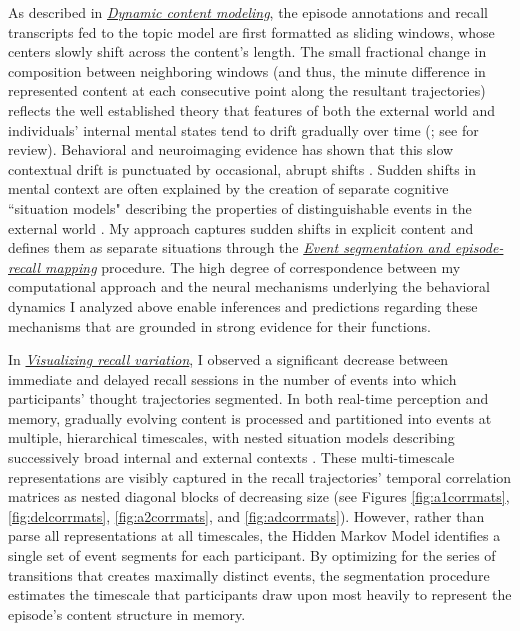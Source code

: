 \documentclass{article}
\begin{document}
As described in \hyperref[sec:topicmodeling]{\textit{Dynamic content modeling}}, the episode annotations and recall transcripts fed to the topic model are first formatted as sliding windows, whose centers slowly shift across the content's length. The small fractional change in composition between neighboring windows (and thus, the minute difference in represented content at each consecutive point along the resultant trajectories) reflects the well established theory that features of both the external world and individuals' internal mental states tend to drift gradually over time (\citealp{HowaKaha02a,ChanEtal17}; see \citealp{Kaha12,MannEtal15} for review).  Behavioral and neuroimaging evidence has shown that this slow contextual drift is punctuated by occasional, abrupt shifts \citep{ZackEtal01a, ZackEtal01b, PolyEtal09, EzzyDava11, DuBrDava13, EzzyDava14, MannEtal16, HeusEtal16, DuBrDava16, ClewDava17, BaldEtal17, BaldEtal18, AlyEtal18, BrunEtal18, HeusEtal18b, SilvEtal19}.  Sudden shifts in mental context are often explained by the creation of separate cognitive ``situation models" describing the properties of distinguishable events in the external world \citep{ZwaaEtal95, ZwaaRadv98, Radv12, RadvZack17}.  My approach captures sudden shifts in explicit content and defines them as separate situations through the \hyperref[sec:eventseg]{\textit{Event segmentation and episode-recall mapping}} procedure.  The high degree of correspondence between my computational approach and the neural mechanisms underlying the behavioral dynamics I analyzed above enable inferences and predictions regarding these mechanisms that are grounded in strong evidence for their functions.

In \hyperref[sec:trajresults]{\textit{Visualizing recall variation}}, I observed a significant decrease between immediate and delayed recall sessions in the number of events into which participants' thought trajectories segmented.  In both real-time perception and memory, gradually evolving content is processed and partitioned into events at multiple, hierarchical timescales, with nested situation models describing successively broad internal and external contexts \citep{SpeeEtal03, SpeeEtal07, KurbZack08, HassEtal08, LernEtal11, HassEtal15, ChenEtal17,BaldEtal17, BaldEtal18}.  These multi-timescale representations are visibly captured in the recall trajectories' temporal correlation matrices as nested diagonal blocks of decreasing size (see Figures \ref{fig:a1corrmats}, \ref{fig:delcorrmats}, \ref{fig:a2corrmats}, and \ref{fig:adcorrmats}).  However, rather than parse all representations at all timescales, the Hidden Markov Model identifies a single set of event segments for each participant.  By optimizing for the series of transitions that creates maximally distinct events, the segmentation procedure estimates the timescale that participants draw upon most heavily to represent the episode's content structure in memory.
\end{document}
